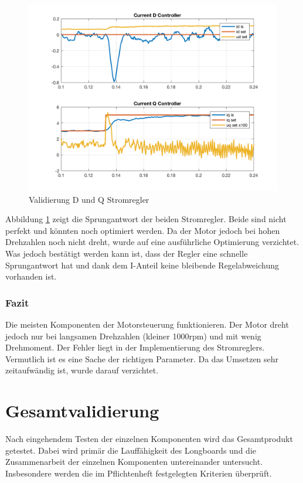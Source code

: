 \begin{figure} [H]
	\centering
	\includegraphics[width=0.8\linewidth]{images/valmccontrollers.png}
	\caption{Validierung D und Q Stromregler}
	\label{fig:reg}
\end{figure}

Abbildung \ref{fig:reg} zeigt die Sprungantwort der beiden Stromregler. Beide sind nicht perfekt und könnten noch optimiert werden. Da der Motor jedoch bei hohen Drehzahlen noch nicht dreht, wurde auf eine ausführliche Optimierung verzichtet. Was jedoch bestätigt werden kann ist, dass der Regler eine schnelle Sprungantwort hat und dank dem I-Anteil keine bleibende Regelabweichung vorhanden ist.


\subsubsection*{Fazit}
Die meisten Komponenten der Motorsteuerung funktionieren. Der Motor dreht jedoch nur bei langsamen Drehzahlen (kleiner 1000rpm) und mit wenig Drehmoment. Der Fehler liegt in der Implementierung des Stromreglers. Vermutlich ist es eine Sache der richtigen Parameter. Da das Umsetzen sehr zeitaufwändig ist, wurde darauf verzichtet.


\section{Gesamtvalidierung} \label{ValidGesamtv}
Nach eingehendem Testen der einzelnen Komponenten wird das Gesamtprodukt getestet. Dabei wird primär die Lauffähigkeit des Longboards und die Zusammenarbeit der einzelnen Komponenten untereinander untersucht. Insbesondere werden die im Pflichtenheft festgelegten Kriterien überprüft.

